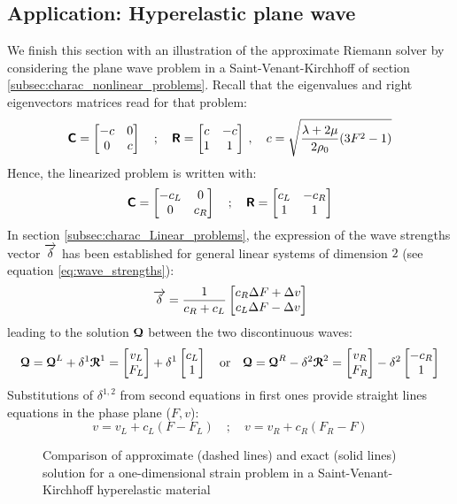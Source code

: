 \subsection{Application: Hyperelastic plane wave}
We finish this section with an illustration of the approximate Riemann solver by considering the plane wave problem in a Saint-Venant-Kirchhoff of section \ref{subsec:charac_nonlinear_problems}.
Recall that the eigenvalues and right eigenvectors matrices read for that problem:
\begin{equation}
  \label{eq:SVK_matrices}
  \boldsymbol{\mathsf{C}} = \left[\begin{matrix}-c & 0 \\ 0 & c\end{matrix}\right] \quad ; \quad \boldsymbol{\mathsf{R}} = \left[\begin{matrix}c & -c\\ 1&1\end{matrix}\right] \:,\quad c=\sqrt{\frac{\lambda + 2\mu}{2\rho_0}(3F^2-1)}
\end{equation}
Hence, the linearized problem is written with:
\begin{equation}
  \label{eq:SVK_matrices_linear}
  \boldsymbol{\mathsf{C}} = \left[\begin{matrix}-c_L & 0 \\ 0 & c_R\end{matrix}\right] \quad ; \quad \boldsymbol{\mathsf{R}} = \left[\begin{matrix}c_L & -c_R\\ 1&1\end{matrix}\right]
\end{equation}
In section \ref{subsec:charac_Linear_problems}, the expression of the wave strengths vector ${\overrightarrow{\delta}}$ has been established for general linear systems of dimension $2$ (see equation \eqref{eq:wave_strengths}):
\begin{equation}
  {\overrightarrow{\delta}}=\frac{1}{c_R+c_L}\left[\begin{matrix}c_R \Delta F +\Delta v\\ c_L \Delta F -\Delta v\end{matrix}\right]
\end{equation}
leading to the solution ${\boldsymbol{\mathcal{Q}}} $ between the two discontinuous waves:
\begin{equation}
  \label{eq:SVK_approx_solution}
  {\boldsymbol{\mathcal{Q}}}  = {\boldsymbol{\mathcal{Q}}}^L + \delta^1 {\boldsymbol{\mathcal{R}}}^1 = \left[\begin{matrix}v_L \\F_L\end{matrix}\right] +\delta^1 \left[\begin{matrix}c_L \\1\end{matrix}\right] \quad \text{or} \quad {\boldsymbol{\mathcal{Q}}}  = {\boldsymbol{\mathcal{Q}}}^R - \delta^2 {\boldsymbol{\mathcal{R}}}^2 = \left[\begin{matrix}v_R \\F_R\end{matrix}\right] -\delta^2 \left[\begin{matrix}-c_R \\1\end{matrix}\right]
\end{equation}
Substitutions of $\delta^{1,2}$ from second equations in first ones provide straight lines equations in the phase plane ($F,v$):
\begin{equation}
  \label{eq:approx_straight}
  v  = v_L + c_L(F -F_L) \quad ; \quad v  = v_R + c_R(F_R-F )
\end{equation}
\begin{figure}[h!]
  \centering
  {  \label{subfig:SVK_Approx1}}
  {  \label{subfig:SVK_Approx4}}
  \caption{Comparison of approximate (dashed lines) and exact (solid lines) solution for a one-dimensional strain problem in a Saint-Venant-Kirchhoff hyperelastic material}
  \label{fig:comparison_exact_approx}
\end{figure}
